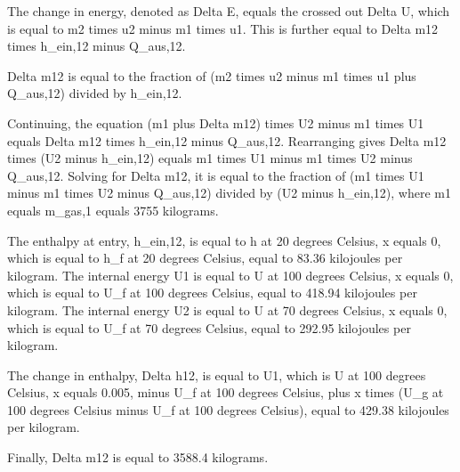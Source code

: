 The change in energy, denoted as Delta E, equals the crossed out Delta U, which is equal to m2 times u2 minus m1 times u1. This is further equal to Delta m12 times h_ein,12 minus Q_aus,12.

Delta m12 is equal to the fraction of (m2 times u2 minus m1 times u1 plus Q_aus,12) divided by h_ein,12.

Continuing, the equation (m1 plus Delta m12) times U2 minus m1 times U1 equals Delta m12 times h_ein,12 minus Q_aus,12. Rearranging gives Delta m12 times (U2 minus h_ein,12) equals m1 times U1 minus m1 times U2 minus Q_aus,12. Solving for Delta m12, it is equal to the fraction of (m1 times U1 minus m1 times U2 minus Q_aus,12) divided by (U2 minus h_ein,12), where m1 equals m_gas,1 equals 3755 kilograms.

The enthalpy at entry, h_ein,12, is equal to h at 20 degrees Celsius, x equals 0, which is equal to h_f at 20 degrees Celsius, equal to 83.36 kilojoules per kilogram. The internal energy U1 is equal to U at 100 degrees Celsius, x equals 0, which is equal to U_f at 100 degrees Celsius, equal to 418.94 kilojoules per kilogram. The internal energy U2 is equal to U at 70 degrees Celsius, x equals 0, which is equal to U_f at 70 degrees Celsius, equal to 292.95 kilojoules per kilogram.

The change in enthalpy, Delta h12, is equal to U1, which is U at 100 degrees Celsius, x equals 0.005, minus U_f at 100 degrees Celsius, plus x times (U_g at 100 degrees Celsius minus U_f at 100 degrees Celsius), equal to 429.38 kilojoules per kilogram.

Finally, Delta m12 is equal to 3588.4 kilograms.